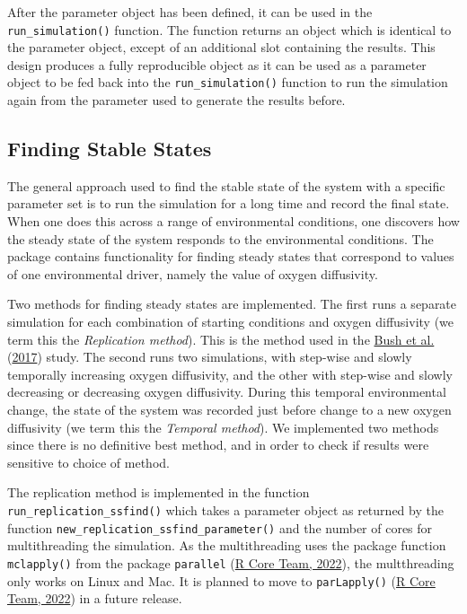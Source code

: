\documentclass[]{elsarticle} %
\begin{document}
After the parameter object has been defined, it can be used in the
\texttt{run\_simulation()} function. The function returns an object
which is identical to the parameter object, except of an additional slot
containing the results. This design produces a fully reproducible object
as it can be used as a parameter object to be fed back into the
\texttt{run\_simulation()} function to run the simulation again from the
parameter used to generate the results before.

\hypertarget{finding-stable-states}{%
\subsection{Finding Stable States}\label{finding-stable-states}}

The general approach used to find the stable state of the system with a
specific parameter set is to run the simulation for a long time and
record the final state. When one does this across a range of
environmental conditions, one discovers how the steady state of the
system responds to the environmental conditions. The package contains
functionality for finding steady states that correspond to values of one
environmental driver, namely the value of oxygen diffusivity.

Two methods for finding steady states are implemented. The first runs a
separate simulation for each combination of starting conditions and
oxygen diffusivity (we term this the \emph{Replication method}). This is
the method used in the \protect\hyperlink{ref-Bush2017}{Bush et al.}
(\protect\hyperlink{ref-Bush2017}{2017}) study. The second runs two
simulations, with step-wise and slowly temporally increasing oxygen
diffusivity, and the other with step-wise and slowly decreasing or
decreasing oxygen diffusivity. During this temporal environmental
change, the state of the system was recorded just before change to a new
oxygen diffusivity (we term this the \emph{Temporal method}). We
implemented two methods since there is no definitive best method, and in
order to check if results were sensitive to choice of method.

The replication method is implemented in the function
\texttt{run\_replication\_ssfind()} which takes a parameter object as
returned by the function \texttt{new\_replication\_ssfind\_parameter()}
and the number of cores for multithreading the simulation. As the
multithreading uses the package function \texttt{mclapply()} from the
package \texttt{parallel} (\protect\hyperlink{ref-RCoreTeam2022}{R Core
Team, 2022}), the multthreading only works on Linux and Mac. It is
planned to move to \texttt{parLapply()}
(\protect\hyperlink{ref-RCoreTeam2022}{R Core Team, 2022}) in a future
release.
\end{document}
